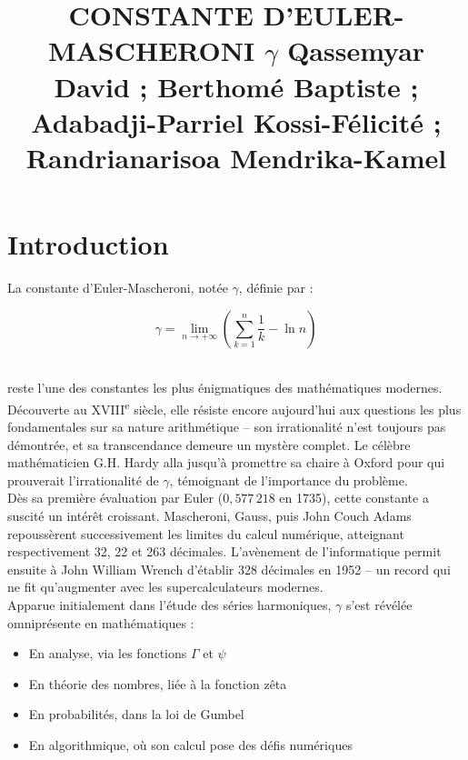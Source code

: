 \documentclass[a4paper,12pt]{article}
\title{CONSTANTE D'EULER-MASCHERONI \(\gamma\)
Qassemyar David ;
    Berthomé Baptiste ;
    Adabadji-Parriel Kossi-Félicité ;
    Randrianarisoa Mendrika-Kamel}
\begin{document}
\author{}
\date{}

\maketitle
\begingroup 
\Large
\tableofcontents
\endgroup 

\newpage
\section*{Introduction}


La constante d'Euler-Mascheroni, notée $\gamma$, définie par :

\begin{tcolorbox}[colback=blue!5!white,colframe=blue!75!black$\gamma$]
\[
\gamma = \lim_{n \to +\infty} \left( \sum_{k=1}^n \frac{1}{k} - \ln n \right)
\]
\end{tcolorbox}\\
reste l'une des constantes les plus énigmatiques des mathématiques modernes. Découverte au XVIII\textsuperscript{e} siècle, elle résiste encore aujourd'hui aux questions les plus fondamentales sur sa nature arithmétique -- son irrationalité n'est toujours pas démontrée, et sa transcendance demeure un mystère complet. Le célèbre mathématicien G.H. Hardy alla jusqu'à promettre sa chaire à Oxford pour qui prouverait l'irrationalité de $\gamma$, témoignant de l'importance du problème. \\

Dès sa première évaluation par Euler ($0{,}577\,218$ en 1735), cette constante a suscité un intérêt croissant. Mascheroni, Gauss, puis John Couch Adams repoussèrent successivement les limites du calcul numérique, atteignant respectivement 32, 22 et 263 décimales. L'avènement de l'informatique permit ensuite à John William Wrench d'établir 328 décimales en 1952 -- un record qui ne fit qu'augmenter avec les supercalculateurs modernes. \\

Apparue initialement dans l'étude des séries harmoniques, $\gamma$ s'est révélée omniprésente en mathématiques :
\begin{itemize}
    \item En analyse, via les fonctions $\Gamma$ et $\psi$

    \item En théorie des nombres, liée à la fonction zêta
    \item En probabilités, dans la loi de Gumbel
    \item En algorithmique, où son calcul pose des défis numériques
\end{itemize} \\
\end{document}
